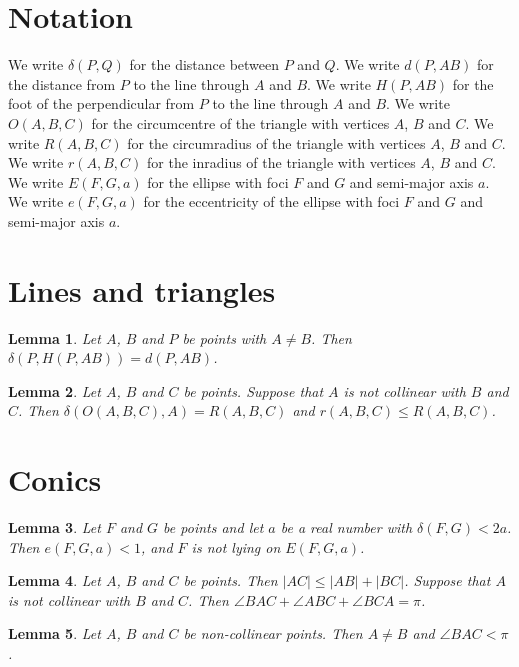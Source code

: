 \documentclass{article}
\newtheorem{lemma}{Lemma}
\begin{document}
\section{Notation}

We write $\delta(P,Q)$ for the distance between $P$ and $Q$.
We write $d(P,AB)$ for the distance from $P$ to the line through $A$ and $B$.
We write $H(P,AB)$ for the foot of the perpendicular from $P$ to the line through $A$ and $B$.
We write $O(A,B,C)$ for the circumcentre of the triangle with vertices $A$, $B$ and $C$.
We write $R(A,B,C)$ for the circumradius of the triangle with vertices $A$, $B$ and $C$.
We write $r(A,B,C)$ for the inradius of the triangle with vertices $A$, $B$ and $C$.
We write $E(F,G,a)$ for the ellipse with foci $F$ and $G$ and semi-major axis $a$.
We write $e(F,G,a)$ for the eccentricity of the ellipse with foci $F$ and $G$ and semi-major axis $a$.

\section{Lines and triangles}

\begin{lemma}\label{foot}
Let $A$, $B$ and $P$ be points with $A\ne B$. Then $\delta(P,H(P,AB))=d(P,AB)$.
\end{lemma}

\begin{lemma}\label{circumcentre}
Let $A$, $B$ and $C$ be points. Suppose that $A$ is not collinear with $B$ and $C$. Then $\delta(O(A,B,C),A)=R(A,B,C)$ and $r(A,B,C)\le R(A,B,C)$.
\end{lemma}

\section{Conics}

\begin{lemma}\label{ellipse}
Let $F$ and $G$ be points and let $a$ be a real number with $\delta(F,G)<2a$. Then $e(F,G,a)<1$, and $F$ is not lying on $E(F,G,a)$.
\end{lemma}

\begin{lemma}\label{angle-sum}
Let $A$, $B$ and $C$ be points. Then $|AC|\le|AB|+|BC|$. Suppose that $A$ is not collinear with $B$ and $C$. Then $\angle BAC+\angle ABC+\angle BCA=\pi$.
\end{lemma}

\begin{lemma}\label{non-collinear}
Let $A$, $B$ and $C$ be non-collinear points. Then $A\ne B$ and $\angle BAC<\pi$.
\end{lemma}
\end{document}
